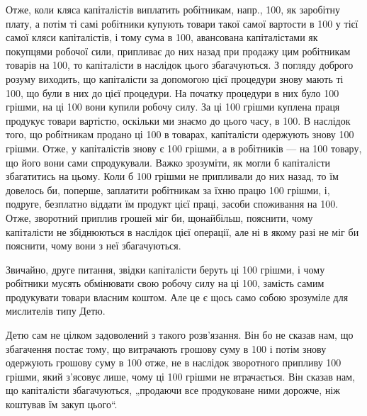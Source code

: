 Отже, коли кляса капіталістів виплатить робітникам, напр., 100,
як заробітну плату, а потім ті самі робітники купують товари такої самої
вартости в 100 у тієї самої кляси капіталістів, і тому сума
в 100, авансована капіталістами як покупцями робочої сили,
припливає до них назад при продажу цим робітникам товарів на 100, то капіталісти в наслідок цього збагачуються. З погляду
доброго розуму виходить, що капіталісти за допомогою цієї процедури
знову мають ті 100, що були в них до цієї процедури. На
початку процедури в них було 100 грішми, на ці 100
вони купили робочу силу. За ці 100 грішми куплена праця
продукує товари вартістю, оскільки ми знаємо до цього часу, в 100. В наслідок того, що робітникам продано ці 100 в товарах,
капіталісти одержують знову 100 грішми. Отже, у капіталістів
знову є 100 грішми, а в робітників — на 100
товару, що його вони сами спродукували. Важко зрозуміти, як могли б
капіталісти збагатитись на цьому. Коли б 100 грішми не припливали
до них назад, то їм довелось би, поперше, заплатити робітникам
за їхню працю 100 грішми, і, подруге, безплатно віддати
їм продукт цієї праці, засоби споживання на 100. Отже, зворотний
приплив грошей міг би, щонайбільш, пояснити, чому капіталісти
не збіднюються в наслідок цієї операції, але ні в якому разі не міг би
пояснити, чому вони з неї збагачуються.

Звичайно, друге питання, звідки капіталісти беруть ці 100
грішми, і чому робітники мусять обмінювати свою робочу силу на ці 100, замість самим продукувати товари власним коштом. Але це є щось
само собою зрозуміле для мислителів типу Детю.

Детю сам не цілком задоволений з такого розв’язання. Він бо не
сказав нам, що збагачення постає тому, що витрачають грошову суму
в 100 і потім знову одержують грошову суму в 100
отже, не в наслідок зворотного припливу 100 грішми, який
з’ясовує лише, чому ці 100 грішми не втрачається. Він сказав
нам, що капіталісти збагачуються, „продаючи все продуковане ними
дорожче, ніж коштував їм закуп цього“.

